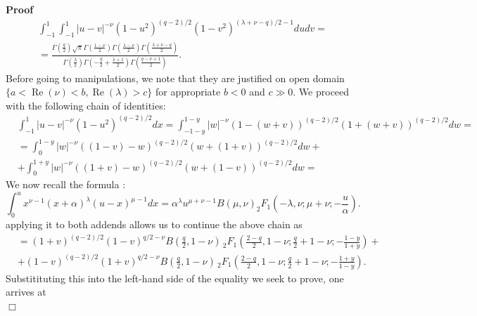 \documentclass{article}
\newcommand{\tmop}[1]{\ensuremath{\operatorname{#1}}}
\renewenvironment{proof}{\noindent\textbf{Proof\ }}{\hspace*{\fill}$\Box$\medskip}
\theoremstyle{remark}
\begin{document}
\begin{proof}
  \begin{eqnarray}
    & \int_{- 1}^1 \int_{- 1}^1 | u - v |^{- \nu} (1 - u^2)^{(q - 2) / 2} (1
    - v^2)^{(\lambda + \nu - q) / 2 - 1} d u d v = &  \nonumber\\
    & = \frac{\Gamma \left( \frac{q}{2} \right) \sqrt{\pi} \Gamma \left(
    \frac{1 - \nu}{2} \right) \Gamma \left( \frac{\lambda - \nu}{2} \right)
    \Gamma \left( \frac{\lambda + \nu - q}{2} \right)}{\Gamma \left(
    \frac{\lambda}{2} \right) \Gamma \left( - \frac{q}{2} + \frac{\lambda +
    1}{2} \right) \Gamma \left( \frac{q - \nu + 1}{2} \right)} . &  \nonumber
  \end{eqnarray}
  Before going to manipulations, we note that they are justified on open
  domain $\{ a < \tmop{Re} (\nu) < b, \tmop{Re} (\lambda) > c \}$ for
  appropriate $b < 0$ and $c \gg 0$. We proceed with the following chain of
  identities:
  \begin{eqnarray}
    & \int_{- 1}^1 | u - v |^{- \nu} (1 - u^2)^{(q - 2) / 2} d x = \int_{- 1
    - y}^{1 - y} | w |^{- \nu} (1 - (w + v))^{(q - 2) / 2} (1 + (w + v))^{(q -
    2) / 2} d w =^{} &  \nonumber\\
    & = \int_0^{1 - y} | w |^{- \nu} ((1 - v) - w)^{(q - 2) / 2} (w + (1 +
    v))^{(q - 2) / 2} d w + &  \nonumber\\
    & + \int_0^{1 + y} | w |^{- \nu} ((1 + v) - w)^{(q - 2) / 2} (w + (1 -
    v))^{(q - 2) / 2} d w = &  \nonumber
  \end{eqnarray}
  We now recall the formula {\cite[ET II 186(9), p.315]{gradshteinryzhik}}:
  \[ \int_0^u x^{\nu - 1} (x + \alpha)^{\lambda} (u - x)^{\mu - 1} d x =
     \alpha^{\lambda} u^{\mu + \nu - 1} B (\mu, \nu)_2 F_1 \left( - \lambda,
     \nu ; \mu + \nu ; - \frac{u}{\alpha} \right) . \]
  applying it to both addends allows us to continue the above chain as
  \begin{eqnarray}
    & = (1 + v)^{(q - 2) / 2} (1 - v)^{q / 2 - \nu} B \left( \frac{q}{2}, 1 -
    \nu \right) \,^{}_2 F_1 \left( \frac{2 - q}{2}, 1 - \nu ; \frac{q}{2} + 1
    - \nu ; - \frac{1 - y}{1 + y} \right) + &  \nonumber\\
    & + (1 - v)^{(q - 2) / 2} (1 + v)^{q / 2 - \nu} B \left( \frac{q}{2}, 1 -
    \nu \right) \,^{}_2 F_1 \left( \frac{2 - q}{2}, 1 - \nu ; \frac{q}{2} + 1
    - \nu ; - \frac{1 + y}{1 - y} \right) . &  \nonumber
  \end{eqnarray}
  Substitituting this into the left-hand side of the equality we seek to
  prove, one arrives at
  \begin{eqnarray}

\end{eqnarray}
\end{proof}
\end{document}
